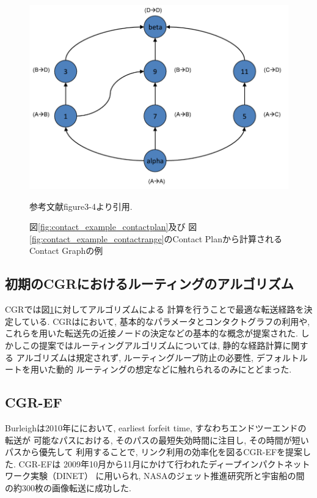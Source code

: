 \begin{figure}[tbh]
    \centering
    \includegraphics[width=0.5\textheight]{img/contact_example_contactgraph.pdf}
    \caption{図\ref{fig:contact_example_contactplan}及び
    図\ref{fig:contact_example_contactrange}のContact Planから計算されるContact Graphの例}
    \label{fig:contact_example_contactgraph}
    \begin{minipage}{\textwidth}
        \centering
        \vspace{3mm}
        参考文献\cite{schedule_aware_bundle_routing}figure3-4より引用.  
    \end{minipage}
\end{figure}
\label{chap:related_works}


\subsection{初期のCGRにおけるルーティングのアルゴリズム}
\label{section:宇宙インターネットにおけるルーティングのアルゴリズム}    
CGRでは図\ref{fig:contact_example_contactgraph}に対してアルゴリズムによる
計算を行うことで最適な転送経路を決定している.  
CGRは\cite{Burleigh2008}において, 基本的なパラメータとコンタクトグラフの利用や, 
これらを用いた転送先の近接ノードの決定などの基本的な概念が提案された.  
しかしこの提案ではルーティングアルゴリズムについては, 静的な経路計算に関する
アルゴリズムは規定されず, ルーティングループ防止の必要性, デフォルトルートを用いた動的
ルーティングの想定などに触れられるのみにとどまった.  

\subsection{CGR-EF}
\label{section:CGR-EF}
Burleighは2010年に\cite{burleigh-dtnrg-cgr-01}において, 
earliest forfeit time, すなわちエンドツーエンドの転送が
可能なパスにおける, そのパスの最短失効時間に注目し, その時間が短いパスから優先して
利用することで, リンク利用の効率化を図るCGR-EFを提案した.  CGR-EFは
2009年10月から11月にかけて行われたディープインパクトネットワーク実験（DINET）
\cite{JPL2009}に用いられ, NASAのジェット推進研究所と宇宙船の間の約300枚の画像転送に成功した.  


